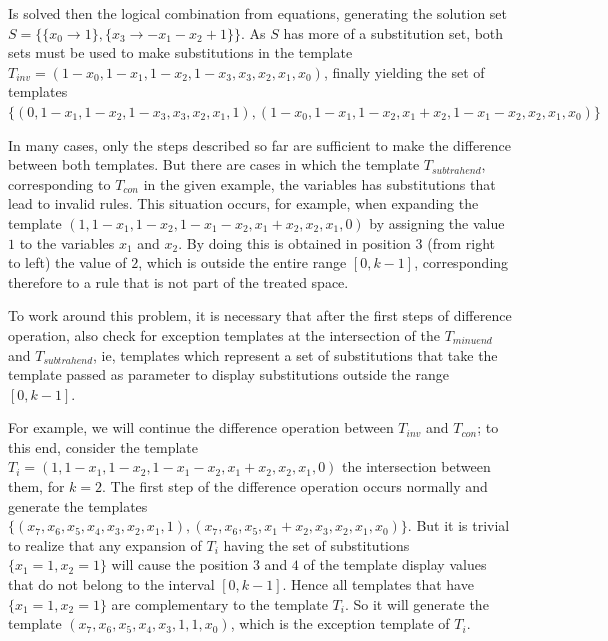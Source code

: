 \documentclass{llncs}
\begin{document}
Is solved then the logical combination from equations, generating the solution set $S = \{\{x_0\to 1\},\{x_3\to -x_1-x_2+1\}\}$. As $S$ has more of a substitution set, both sets must be used to make substitutions in the template $T_{inv} = (1 - x_0, 1 - x_1, 1 - x_2, 1 - x_3, x_3, x_2, x_1, x_0)$, finally yielding the set of templates $\{(0, 1 - x_1, 1 - x_2, 1 - x_3, x_3, x_2, x_1, 1),(1 - x_0, 1 - x_1, 1 - x_2, x_1 + x_2, 1 - x_1 - x_2, x_2, x_1, x_0)\}$

In many cases, only the steps described so far are sufficient to make the difference between both templates. But there are cases in which the template $T_{subtrahend}$, corresponding to $T_{con}$ in the given example, the variables has substitutions that lead to invalid rules. This situation occurs, for example, when expanding the template $(1, 1 - x_1, 1 - x_2, 1 - x_1 - x_2, x_1 + x_2, x_2, x_1, 0)$ by assigning the value $1$ to the variables $x_1$ and $x_2$. By doing this is obtained in position $3$ (from right to left) the value of $2$, which is outside the entire range $[0, k-1]$, corresponding therefore to a rule that is not part of the treated space.

To work around this problem, it is necessary that after the first steps of difference operation, also check for exception templates at the intersection of the $T_{minuend}$ and $T_{subtrahend}$, ie, templates which represent a set of substitutions that take the template passed as parameter to display  substitutions outside the range $[0,k-1]$. %

For example, we will continue the difference operation between $T_{inv}$ and $T_{con}$; to this end, consider the template $T_i = (1, 1 - x_1, 1 - x_2, 1 - x_1 - x_2, x_1 + x_2, x_2, x_1, 0)$ the intersection between them, for $k=2$.
The first step of the difference operation occurs normally and generate the templates $\{(x_7, x_6, x_5, x_4, x_3, x_2, x_1, 1),(x_7, x_6, x_5, x_1 + x_2, x_3, x_2, x_1, x_0)\}$.
But it is trivial to realize that any expansion of $T_i$ having the set of substitutions $\{x_1 = 1, x_2 = 1\}$ will cause the position $3$ and $4$ of the template display values that do not belong to the interval $[0,k-1]$.
Hence all templates that have $\{x_1 = 1, x_2 = 1\}$ are complementary to the template $T_i$. So it will generate the template $(x_7, x_6, x_5, x_4, x_3, 1, 1, x_0)$, which is the exception template of $T_i$.
\end{document}
